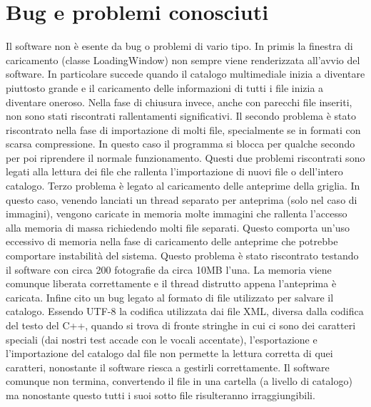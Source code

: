 \section{Bug e problemi conosciuti}

Il software non è esente da bug o problemi di vario tipo. In primis la finestra di caricamento (classe LoadingWindow) non sempre viene renderizzata all'avvio del 
software. In particolare succede quando il catalogo multimediale inizia a diventare piuttosto grande e il caricamento delle informazioni di tutti i file inizia a diventare oneroso.
Nella fase di chiusura invece, anche con parecchi file inseriti, non sono stati riscontrati rallentamenti significativi. \newline
Il secondo problema è stato riscontrato nella fase di importazione di molti file, specialmente se in formati con scarsa compressione. In questo caso il programma si blocca per 
qualche secondo per poi riprendere il normale funzionamento. Questi due problemi riscontrati sono legati alla lettura dei file che rallenta l'importazione di nuovi file o dell'intero
catalogo. \newline
Terzo problema è legato al caricamento delle anteprime della griglia. In questo caso, venendo lanciati un thread separato per anteprima (solo nel caso di immagini),
vengono caricate in memoria molte immagini che rallenta l'accesso alla memoria di massa richiedendo molti file separati. Questo comporta un'uso eccessivo di memoria nella fase di
caricamento delle anteprime che potrebbe comportare instabilità del sistema. Questo problema è stato riscontrato testando il software con circa 200 fotografie da circa 10MB l'una.
La memoria viene comunque liberata correttamente e il thread distrutto appena l'anteprima è caricata. \newline
Infine cito un bug legato al formato di file utilizzato per salvare il catalogo. Essendo UTF-8 la codifica utilizzata dai file XML, diversa dalla codifica
del testo del C++, quando si trova di fronte stringhe in cui ci sono dei caratteri speciali (dai nostri test accade con le vocali accentate), l'esportazione e l'importazione 
del catalogo dal file non permette la lettura corretta di quei caratteri, nonostante il software riesca a gestirli correttamente. Il software comunque non termina, convertendo il 
file in una cartella (a livello di catalogo) ma nonostante questo tutti i suoi sotto file risulteranno irraggiungibili.